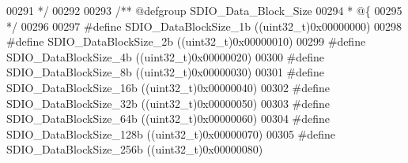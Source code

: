 \begin{DoxyCode}
00291 \textcolor{comment}{  */}
00292 
00293 \textcolor{comment}{/** @defgroup SDIO\_Data\_Block\_Size }
00294 \textcolor{comment}{  * @\{}
00295 \textcolor{comment}{  */}
00296 
00297 \textcolor{preprocessor}{#}\textcolor{preprocessor}{define} \textcolor{preprocessor}{SDIO\_DataBlockSize\_1b}               \textcolor{preprocessor}{(}\textcolor{preprocessor}{(}\textcolor{preprocessor}{uint32\_t}\textcolor{preprocessor}{)}0x00000000\textcolor{preprocessor}{)}
00298 \textcolor{preprocessor}{#}\textcolor{preprocessor}{define} \textcolor{preprocessor}{SDIO\_DataBlockSize\_2b}               \textcolor{preprocessor}{(}\textcolor{preprocessor}{(}\textcolor{preprocessor}{uint32\_t}\textcolor{preprocessor}{)}0x00000010\textcolor{preprocessor}{)}
00299 \textcolor{preprocessor}{#}\textcolor{preprocessor}{define} \textcolor{preprocessor}{SDIO\_DataBlockSize\_4b}               \textcolor{preprocessor}{(}\textcolor{preprocessor}{(}\textcolor{preprocessor}{uint32\_t}\textcolor{preprocessor}{)}0x00000020\textcolor{preprocessor}{)}
00300 \textcolor{preprocessor}{#}\textcolor{preprocessor}{define} \textcolor{preprocessor}{SDIO\_DataBlockSize\_8b}               \textcolor{preprocessor}{(}\textcolor{preprocessor}{(}\textcolor{preprocessor}{uint32\_t}\textcolor{preprocessor}{)}0x00000030\textcolor{preprocessor}{)}
00301 \textcolor{preprocessor}{#}\textcolor{preprocessor}{define} \textcolor{preprocessor}{SDIO\_DataBlockSize\_16b}              \textcolor{preprocessor}{(}\textcolor{preprocessor}{(}\textcolor{preprocessor}{uint32\_t}\textcolor{preprocessor}{)}0x00000040\textcolor{preprocessor}{)}
00302 \textcolor{preprocessor}{#}\textcolor{preprocessor}{define} \textcolor{preprocessor}{SDIO\_DataBlockSize\_32b}              \textcolor{preprocessor}{(}\textcolor{preprocessor}{(}\textcolor{preprocessor}{uint32\_t}\textcolor{preprocessor}{)}0x00000050\textcolor{preprocessor}{)}
00303 \textcolor{preprocessor}{#}\textcolor{preprocessor}{define} \textcolor{preprocessor}{SDIO\_DataBlockSize\_64b}              \textcolor{preprocessor}{(}\textcolor{preprocessor}{(}\textcolor{preprocessor}{uint32\_t}\textcolor{preprocessor}{)}0x00000060\textcolor{preprocessor}{)}
00304 \textcolor{preprocessor}{#}\textcolor{preprocessor}{define} \textcolor{preprocessor}{SDIO\_DataBlockSize\_128b}             \textcolor{preprocessor}{(}\textcolor{preprocessor}{(}\textcolor{preprocessor}{uint32\_t}\textcolor{preprocessor}{)}0x00000070\textcolor{preprocessor}{)}
00305 \textcolor{preprocessor}{#}\textcolor{preprocessor}{define} \textcolor{preprocessor}{SDIO\_DataBlockSize\_256b}             \textcolor{preprocessor}{(}\textcolor{preprocessor}{(}\textcolor{preprocessor}{uint32\_t}\textcolor{preprocessor}{)}0x00000080\textcolor{preprocessor}{)}

\end{DoxyCode}
